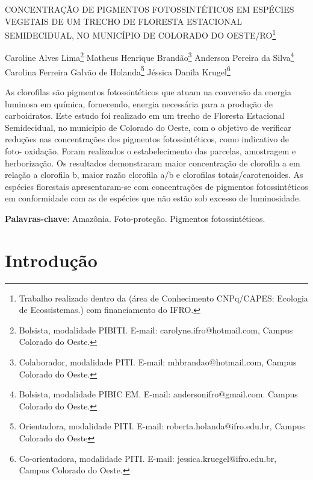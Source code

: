 \documentclass[article,12pt,onesidea,4paper,english,brazil]{abntex2}
\begin{document}
	
	
	\frenchspacing 
	
	\begin{center}
		\LARGE CONCENTRAÇÃO DE PIGMENTOS FOTOSSINTÉTICOS EM ESPÉCIES VEGETAIS DE UM TRECHO DE FLORESTA ESTACIONAL SEMIDECIDUAL, NO MUNICÍPIO DE COLORADO DO OESTE/RO\footnote{Trabalho realizado dentro da (área de Conhecimento CNPq/CAPES: Ecologia de Ecossistemas.) com financiamento do IFRO.}
		
		\normalsize
		Caroline Alves Lima\footnote{Bolsista, modalidade PIBITI. E-mail: carolyne.ifro@hotmail.com, Campus Colorado do Oeste.} 
		Matheus Henrique  Brandão\footnote{ Colaborador, modalidade PITI. E-mail: mhbrandao@hotmail.com, Campus Colorado do Oeste.} 
		Anderson Pereira da Silva\footnote{Bolsista, modalidade PIBIC EM. E-mail: andersonifro@gmail.com. Campus Colorado do Oeste.} 
	Carolina Ferreira Galvão de Holanda\footnote{Orientadora, modalidade PITI. E-mail: roberta.holanda@ifro.edu.br, Campus Colorado do Oeste } 
	Jéssica Danila Krugel\footnote{Co-orientadora, modalidade PITI. E-mail: jessica.kruegel@ifro.edu.br, Campus Colorado do Oeste.}
	
	\end{center}
	
	\begin{resumoumacoluna}
	As clorofilas são pigmentos fotossintéticos que atuam na conversão da energia luminosa em química, fornecendo, energia necessária para a produção de carboidratos. Este estudo foi realizado em um trecho de Floresta Estacional Semidecidual, no município de Colorado do Oeste, com o objetivo de verificar reduções nas concentrações dos pigmentos fotossintéticos, como indicativo de foto- oxidação. Foram realizados o estabelecimento das parcelas, amostragem e herborização. Os resultados demonstraram maior concentração de clorofila a em relação a clorofila b, maior razão clorofila a/b e clorofilas totais/carotenoides. As espécies florestais apresentaram-se com concentrações de pigmentos fotossintéticos em conformidade com as de espécies que não estão sob excesso de luminosidade.
		\vspace{\onelineskip}
		
		\noindent
		\textbf{Palavras-chave}: Amazônia. Foto-proteção. Pigmentos fotossintéticos.
	\end{resumoumacoluna}
	
	\section*{Introdução}
	
\end{document}
